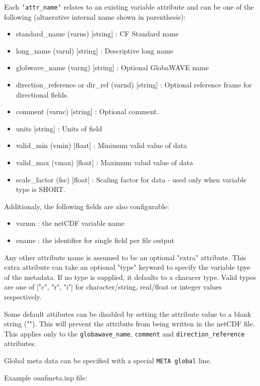 \noindent
Each \texttt{`attr\_name`} relates to an existing variable attribute and
can be one of the following (altnerative internal name shown in parenthesis):
\begin{itemize}
 \item  standard\_name (varns) [string] : CF Standard name
 \item  long\_name (varnl) [string] : Descriptive long name
 \item  globwave\_name (varng) [string] : Optional GlobaWAVE name
 \item  direction\_reference or dir\_ref (varnd) [string] : Optional reference
 frame for directional fields.
 \item  comment (varnc) [string] : Optional comment.
 \item  units [string] : Units of field
 \item  valid\_min (vmin) [float] : Minimum valid value of data
 \item  valid\_max (vmax) [float] : Maximum valud value of data
 \item  scale\_factor (fsc) [float] : Scaling factor for data - used only when
 variable type is SHORT.
\end{itemize}

\noindent
Additionaly, the following fields are also configurable:
\begin{itemize}
 \item  varnm : the netCDF variable name
 \item  ename : the identifier for single field per file output
\end{itemize}

\noindent
Any other attribute name is assumed to be an optional "extra" 
attribute. This extra attribute can take an optional "type"
keyword to specify the variable tpye of the metadata. If 
no type is supplied, it defaults to a characer type. Valid
types are one of ["c", "r", "i"] for character/string, 
real/float or integer values respectively.

\noindent Some default attibutes can be disabled by setting 
the attribute value to a blank string (""). This will prevent
the attribute from being written in the netCDF file. This
applies only to the \texttt{globawave\_name}, \texttt{comment}
and \texttt{direction\_reference} attributes.

\noindent
Global meta data can be specified with a special \texttt{META global} line.

\noindent
Example ounfmeta.inp file:

